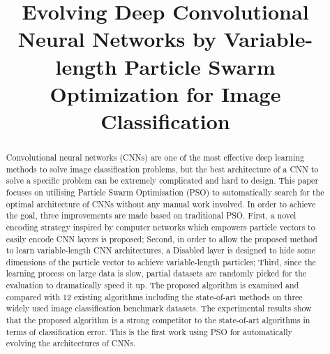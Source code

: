 \documentclass[conference]{IEEEtran}
\begin{document}
\title{Evolving Deep Convolutional Neural Networks by Variable-length Particle Swarm Optimization for Image Classification}


\author{
}











\maketitle

\begin{abstract}
Convolutional neural networks (CNNs) are one of the most effective deep learning methods to solve image classification problems, but the best architecture of a CNN to solve a specific problem can be extremely complicated and hard to design. This paper focuses on utilising Particle Swarm Optimisation (PSO) to automatically search for the optimal architecture of CNNs without any manual work involved. In order to achieve the goal, three improvements are made based on traditional PSO.
First, a novel encoding strategy inspired by computer networks which empowers particle vectors to easily encode CNN layers is proposed; Second, in order to allow the proposed method to learn variable-length CNN architectures, a Disabled layer is designed to hide some dimensions of the particle vector to achieve variable-length particles; Third, since the learning process on large data is slow, partial datasets are randomly picked for the evaluation to dramatically speed it up. The proposed algorithm is examined and compared with 12 existing algorithms including the state-of-art methods on three widely used image classification benchmark datasets. The experimental results show that the proposed algorithm is a strong competitor to the state-of-art algorithms in terms of classification error. This is the first work using PSO for automatically evolving the architectures of CNNs.
\end{abstract}
\end{document}
